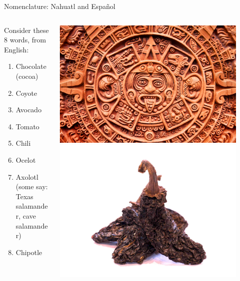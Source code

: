 \documentclass{beamer}
\begin{document}
\begin{frame}{Nomenclature: Nahuatl and Espa\~{n}ol}
\small
\begin{columns}[T]
\begin{column}{0.65\textwidth}
Consider these 8 words, from English:
\begin{enumerate}
\item Chocolate (cocoa)
\item Coyote
\item Avocado
\item Tomato
\item Chili
\item Ocelot
\item Axolotl (some say: Texas salamander, cave salamander)
\item Chipotle
\end{enumerate}
\end{column}
\begin{column}{0.35\textwidth}
\includegraphics[width=0.9\textwidth]{figures/aztec.jpg}
\includegraphics[width=0.9\textwidth]{figures/chipotle.jpg}

\end{column}
\end{columns}
\end{frame}
\end{document}

